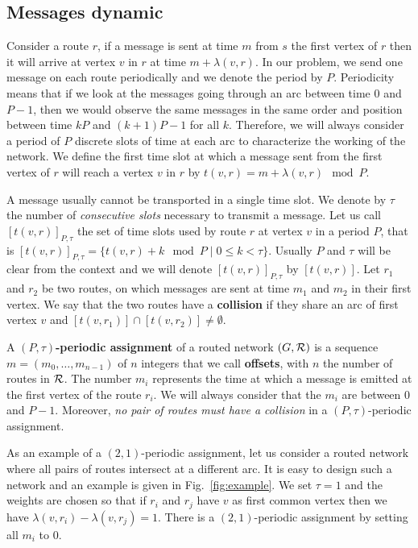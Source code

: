 \documentclass[10pt, conference, letterpaper]{IEEEtran}
\begin{document}
   \subsection{Messages dynamic}
      
      Consider a route $r$, if a message is sent at time $m$ from $s$ the first vertex of $r$ then it will arrive at vertex $v$ in $r$ at time $m + \lambda(v,r)$. In our problem, we send one message on each route periodically and we denote the period by $P$.
      Periodicity means that if we look at the messages going through an arc between time $0$ and $P-1$, then we would observe the same messages in the same order and position between time $kP$ and $(k+1)P -1$ for all $k$. 
      Therefore, we will always consider a period of $P$ discrete slots of time at each arc to characterize the working of the network. We define the first time slot at which a message sent from the first vertex of $r$ will reach a vertex $v$ in $r$ by $t(v,r) = m + \lambda(v,r) \mod P$. 
      
      A message usually cannot be transported in a single time slot. We denote by $\tau$ the number 
      of \emph{consecutive slots} necessary to transmit a message. Let us call $[t(v,r)]_{P,\tau}$ the set of time slots used by route $r$ at vertex $v$ in a period $P$, that is $[t(v,r)]_{P,\tau} = \{t(v,r) + k \mod P \mid 0 \leq k < \tau \}$. Usually $P$ and $\tau$ will be clear from the context and we will denote $[t(v,r)]_{P,\tau}$ by $[t(v,r)]$.
      Let $r_1$ and $r_2$ be two routes, on which messages are sent at time $m_1$ and $m_2$ in their first vertex.
      We say that the two routes have a {\bf collision} if they share an arc of first vertex $v$ and $[t(v,r_{1})] \cap [t(v,r_{2})] \neq \emptyset$.
      
      A {\bf $(P,\tau)$-periodic assignment} of a routed network $(G,\cal R)$ is a sequence  $m=(m_0, \ldots ,m_{n-1})$ of $n$ integers that we call {\bf offsets}, with $n$ the number of routes in $\cal R$. The number $m_{i}$ represents the time at which a message is emitted at the first vertex of the route $r_{i}$. We will always consider that the $m_{i}$ are between $0$ and $P-1$. Moreover, \emph{no pair of routes must have a collision} in a $(P,\tau)$-periodic assignment.

      As an example of a $(2,1)$-periodic assignment, let us consider a routed network 
      where all pairs of routes intersect at a different arc. It is easy to design such a network and an example is given in Fig.~\ref{fig:example}. We set $\tau = 1$ and the weights are chosen so that if $r_{i}$ and $r_{j}$ have $v$ as first common vertex then we have $\lambda(v,r_{i}) - \lambda(v,r_{j})=1$. There is a $(2,1)$-periodic assignment by setting all $m_{i}$ to $0$.
\end{document}
